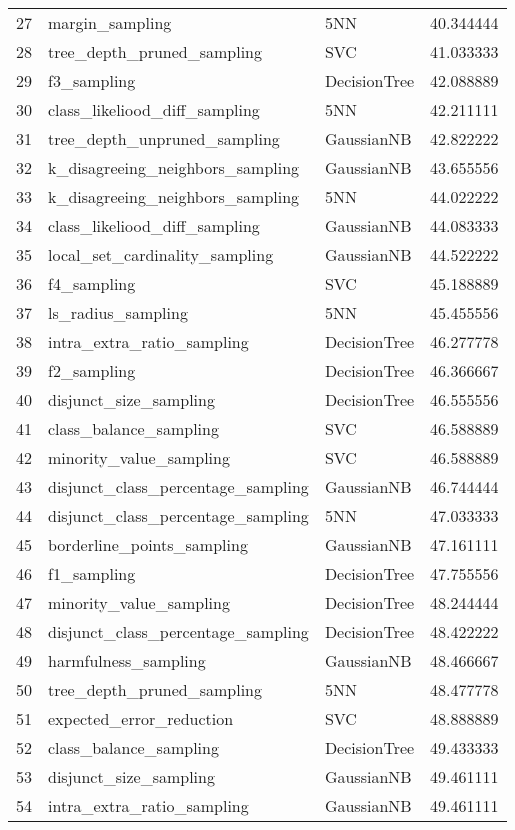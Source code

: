 \begin{tabular}{lllr}
27 & margin_sampling & 5NN & 40.344444 \\
28 & tree_depth_pruned_sampling & SVC & 41.033333 \\
29 & f3_sampling & DecisionTree & 42.088889 \\
30 & class_likeliood_diff_sampling & 5NN & 42.211111 \\
31 & tree_depth_unpruned_sampling & GaussianNB & 42.822222 \\
32 & k_disagreeing_neighbors_sampling & GaussianNB & 43.655556 \\
33 & k_disagreeing_neighbors_sampling & 5NN & 44.022222 \\
34 & class_likeliood_diff_sampling & GaussianNB & 44.083333 \\
35 & local_set_cardinality_sampling & GaussianNB & 44.522222 \\
36 & f4_sampling & SVC & 45.188889 \\
37 & ls_radius_sampling & 5NN & 45.455556 \\
38 & intra_extra_ratio_sampling & DecisionTree & 46.277778 \\
39 & f2_sampling & DecisionTree & 46.366667 \\
40 & disjunct_size_sampling & DecisionTree & 46.555556 \\
41 & class_balance_sampling & SVC & 46.588889 \\
42 & minority_value_sampling & SVC & 46.588889 \\
43 & disjunct_class_percentage_sampling & GaussianNB & 46.744444 \\
44 & disjunct_class_percentage_sampling & 5NN & 47.033333 \\
45 & borderline_points_sampling & GaussianNB & 47.161111 \\
46 & f1_sampling & DecisionTree & 47.755556 \\
47 & minority_value_sampling & DecisionTree & 48.244444 \\
48 & disjunct_class_percentage_sampling & DecisionTree & 48.422222 \\
49 & harmfulness_sampling & GaussianNB & 48.466667 \\
50 & tree_depth_pruned_sampling & 5NN & 48.477778 \\
51 & expected_error_reduction & SVC & 48.888889 \\
52 & class_balance_sampling & DecisionTree & 49.433333 \\
53 & disjunct_size_sampling & GaussianNB & 49.461111 \\
54 & intra_extra_ratio_sampling & GaussianNB & 49.461111 \\

\end{tabular}

